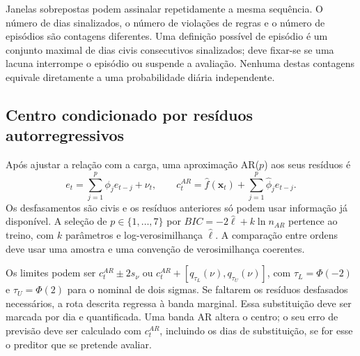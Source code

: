 Janelas sobrepostas podem assinalar repetidamente a mesma sequência. O número de dias sinalizados, o número de violações de regras e o número de episódios são contagens diferentes. Uma definição possível de episódio é um conjunto maximal de dias civis consecutivos sinalizados; deve fixar-se se uma lacuna interrompe o episódio ou suspende a avaliação. Nenhuma destas contagens equivale diretamente a uma probabilidade diária independente\parencite{Nelson1984,Wardell1994}.


\subsection{Centro condicionado por resíduos autorregressivos}
\label{sec:mat-ar-bandas}
Após ajustar a relação com a carga, uma aproximação AR($p$) aos seus resíduos é
\begin{equation}
e_t=\sum_{j=1}^p\phi_je_{t-j}+\nu_t,
\qquad c_t^{AR}=\widehat f(\boldsymbol x_t)+\sum_{j=1}^p\widehat\phi_je_{t-j}.
\label{eq:mat-centro-ar}
\end{equation}
Os desfasamentos são civis e os resíduos anteriores só podem usar informação já disponível. A seleção de $p\in\{1,\ldots,7\}$ por $BIC=-2\widehat\ell+k\ln n_{AR}$ pertence ao treino, com $k$ parâmetros e log-verosimilhança $\widehat\ell$\parencite{Schwarz1978}. A comparação entre ordens deve usar uma amostra e uma convenção de verosimilhança coerentes.

Os limites podem ser $c_t^{AR}\pm2s_\nu$ ou $c_t^{AR}+[q_{\tau_L}(\nu),q_{\tau_U}(\nu)]$, com $\tau_L=\Phi(-2)$ e $\tau_U=\Phi(2)$ para o nominal de dois sigmas. Se faltarem os resíduos desfasados necessários, a rota descrita regressa à banda marginal. Essa substituição deve ser marcada por dia e quantificada. Uma banda AR altera o centro; o seu erro de previsão deve ser calculado com $c_t^{AR}$, incluindo os dias de substituição, se for esse o preditor que se pretende avaliar.

